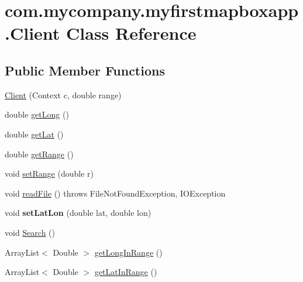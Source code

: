 \hypertarget{classcom_1_1mycompany_1_1myfirstmapboxapp_1_1_client}{}\section{com.\+mycompany.\+myfirstmapboxapp.\+Client Class Reference}
\label{classcom_1_1mycompany_1_1myfirstmapboxapp_1_1_client}
\subsection*{Public Member Functions}
\begin{DoxyCompactItemize}
\item 
\hyperlink{classcom_1_1mycompany_1_1myfirstmapboxapp_1_1_client_a89ac331e3bb40c52719d2010266b85f0}{Client} (Context c, double range)
\item 
double \hyperlink{classcom_1_1mycompany_1_1myfirstmapboxapp_1_1_client_a9031b30d8df4870906f1be12dcd837d8}{get\+Long} ()
\item 
double \hyperlink{classcom_1_1mycompany_1_1myfirstmapboxapp_1_1_client_af58e5d80e423b077154905841faebb36}{get\+Lat} ()
\item 
double \hyperlink{classcom_1_1mycompany_1_1myfirstmapboxapp_1_1_client_a5e8c78cedd5da1bf14479de9b6c273e3}{get\+Range} ()
\item 
void \hyperlink{classcom_1_1mycompany_1_1myfirstmapboxapp_1_1_client_af6081be70dc01d9390ba63262e3b5bcd}{set\+Range} (double r)
\item 
void \hyperlink{classcom_1_1mycompany_1_1myfirstmapboxapp_1_1_client_a78099d36b3c4131263265bb729846944}{read\+File} ()  throws File\+Not\+Found\+Exception, I\+O\+Exception
\item 
\mbox{\label{classcom_1_1mycompany_1_1myfirstmapboxapp_1_1_client_a26327ae8b4074d4e5f4ea99be275224e}} 
void {\bfseries set\+Lat\+Lon} (double lat, double lon)
\item 
void \hyperlink{classcom_1_1mycompany_1_1myfirstmapboxapp_1_1_client_ac7bf8679bc329dce49f1afce43531ea0}{Search} ()
\item 
Array\+List$<$ Double $>$ \hyperlink{classcom_1_1mycompany_1_1myfirstmapboxapp_1_1_client_a26c05de0176e2065b1042e277cd82d57}{get\+Long\+In\+Range} ()
\item 
Array\+List$<$ Double $>$ \hyperlink{classcom_1_1mycompany_1_1myfirstmapboxapp_1_1_client_abc6f4428f0d7b67f64eb77caffeb9e7f}{get\+Lat\+In\+Range} ()

\end{DoxyCompactItemize}
